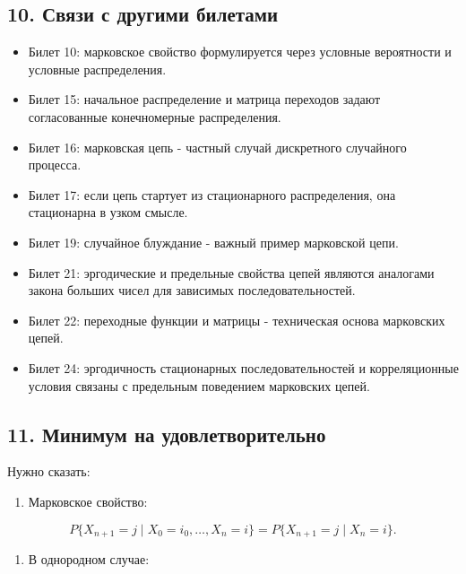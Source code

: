 \documentclass[
  11pt,
  a4paper,
]{article}
\providecommand{\tightlist}{%
  \setlength{\itemsep}{0pt}\setlength{\parskip}{0pt}}
\begin{document}
\subsection{10. Связи с другими
билетами}\label{ux441ux432ux44fux437ux438-ux441-ux434ux440ux443ux433ux438ux43cux438-ux431ux438ux43bux435ux442ux430ux43cux438}

\begin{itemize}
\tightlist
\item
  Билет 10: марковское свойство формулируется через условные вероятности
  и условные распределения.
\item
  Билет 15: начальное распределение и матрица переходов задают
  согласованные конечномерные распределения.
\item
  Билет 16: марковская цепь - частный случай дискретного случайного
  процесса.
\item
  Билет 17: если цепь стартует из стационарного распределения, она
  стационарна в узком смысле.
\item
  Билет 19: случайное блуждание - важный пример марковской цепи.
\item
  Билет 21: эргодические и предельные свойства цепей являются аналогами
  закона больших чисел для зависимых последовательностей.
\item
  Билет 22: переходные функции и матрицы - техническая основа марковских
  цепей.
\item
  Билет 24: эргодичность стационарных последовательностей и
  корреляционные условия связаны с предельным поведением марковских
  цепей.
\end{itemize}

\subsection{11. Минимум на
удовлетворительно}\label{ux43cux438ux43dux438ux43cux443ux43c-ux43dux430-ux443ux434ux43eux432ux43bux435ux442ux432ux43eux440ux438ux442ux435ux43bux44cux43dux43e}

Нужно сказать:

\begin{enumerate}
\def\labelenumi{\arabic{enumi}.}
\tightlist
\item
  Марковское свойство:
\end{enumerate}

\[
P\{X_{n+1}=j\mid X_0=i_0,\ldots,X_n=i\}
=
P\{X_{n+1}=j\mid X_n=i\}.
\]

\begin{enumerate}
\def\labelenumi{\arabic{enumi}.}
\setcounter{enumi}{1}
\tightlist
\item
  В однородном случае:
\end{enumerate}
\end{document}
